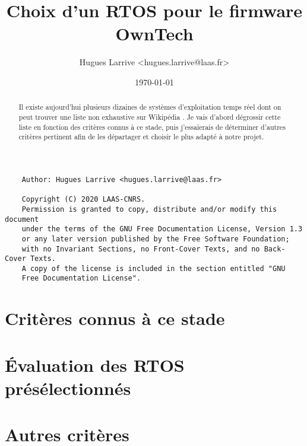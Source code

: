 \documentclass[a4paper,12pt, twoside]{article}
\title{Choix d'un RTOS pour le firmware OwnTech}
\author{Hugues Larrive <hugues.larrive@laas.fr>}
\date{\today}	%
\begin{document}
\maketitle{}


\begin{abstract}
	Il existe aujourd'hui plusieurs dizaines de systèmes d'exploitation temps réel
	dont on peut trouver une liste non exhaustive sur Wikipédia \cite{ref1}.
	Je vais d'abord dégrossir cette liste en fonction des critères connus à ce stade,
	puis j'essaierais de déterminer d'autres critères pertinent afin de les
	départager et choisir le plus adapté à notre projet.
\end{abstract}


{\footnotesize
\begin{verbatim}
    Author: Hugues Larrive <hugues.larrive@laas.fr>

	Copyright (C) 2020 LAAS-CNRS.
	Permission is granted to copy, distribute and/or modify this document
	under the terms of the GNU Free Documentation License, Version 1.3
	or any later version published by the Free Software Foundation;
	with no Invariant Sections, no Front-Cover Texts, and no Back-Cover Texts.
	A copy of the license is included in the section entitled "GNU
	Free Documentation License".
\end{verbatim}
}

\newpage

\renewcommand{\contentsname}{Sommaire}
\tableofcontents{}




\section{Critères connus à ce stade}


\section{Évaluation des RTOS présélectionnés}


\section{Autres critères}


\end{document}
